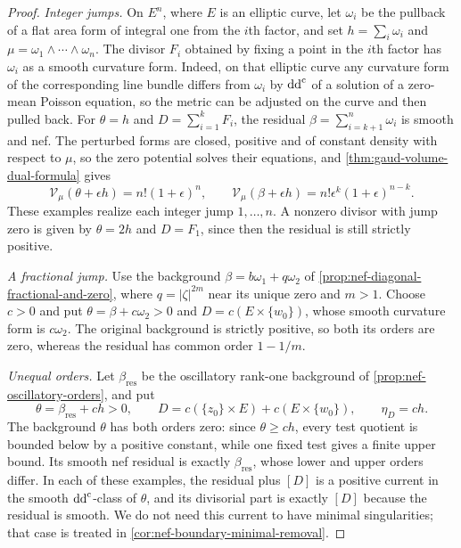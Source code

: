\begin{proof}
\emph{Integer jumps.} On $E^n$, where $E$ is an elliptic curve, let $\omega_i$ be the pullback of a flat area form of integral one from the $i$th factor, and set $h=\sum_i\omega_i$ and $\mu=\omega_1\wedge\cdots\wedge\omega_n$. The divisor $F_i$ obtained by fixing a point in the $i$th factor has $\omega_i$ as a smooth curvature form. Indeed, on that elliptic curve any curvature form of the corresponding line bundle differs from $\omega_i$ by $\mathrm{dd}^{\mathrm{c}}$ of a solution of a zero-mean Poisson equation, so the metric can be adjusted on the curve and then pulled back. For $\theta=h$ and $D=\sum_{i=1}^kF_i$, the residual $\beta=\sum_{i=k+1}^n\omega_i$ is smooth and nef. The perturbed forms are closed, positive and of constant density with respect to $\mu$, so the zero potential solves their equations, and \cref{thm:gaud-volume-dual-formula} gives
\begin{equation}\label{eq:nef-integer-residual-jump}
 \mathcal V_\mu(\theta+\epsilon h)=n!(1+\epsilon)^n,\qquad
 \mathcal V_\mu(\beta+\epsilon h)=n!\epsilon^k(1+\epsilon)^{n-k}.
\end{equation}
These examples realize each integer jump $1,\ldots,n$. A nonzero divisor with jump zero is given by $\theta=2h$ and $D=F_1$, since then the residual is still strictly positive.

\emph{A fractional jump.} Use the background $\beta=b\omega_1+q\omega_2$ of \cref{prop:nef-diagonal-fractional-and-zero}, where $q=|\zeta|^{2m}$ near its unique zero and $m>1$. Choose $c>0$ and put $\theta=\beta+c\omega_2>0$ and $D=c(E\times\{w_0\})$, whose smooth curvature form is $c\omega_2$. The original background is strictly positive, so both its orders are zero, whereas the residual has common order $1-1/m$.

\emph{Unequal orders.} Let $\beta_{\mathrm{res}}$ be the oscillatory rank-one background of \cref{prop:nef-oscillatory-orders}, and put
\[
 \theta=\beta_{\mathrm{res}}+ch>0,\qquad
 D=c(\{z_0\}\times E)+c(E\times\{w_0\}),\qquad
 \eta_D=ch.
\]
The background $\theta$ has both orders zero: since $\theta\geq ch$, every test quotient is bounded below by a positive constant, while one fixed test gives a finite upper bound. Its smooth nef residual is exactly $\beta_{\mathrm{res}}$, whose lower and upper orders differ. In each of these examples, the residual plus $[D]$ is a positive current in the smooth $\mathrm{dd}^{\mathrm{c}}$-class of $\theta$, and its divisorial part is exactly $[D]$ because the residual is smooth. We do not need this current to have minimal singularities; that case is treated in \cref{cor:nef-boundary-minimal-removal}.


\end{proof}
